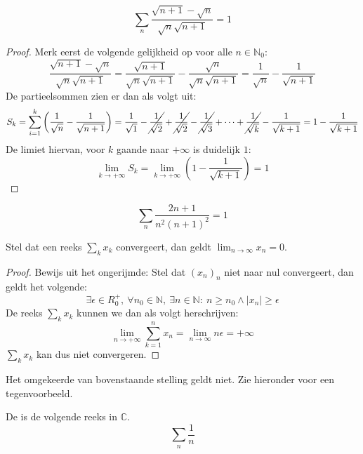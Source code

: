 \documentclass[main.tex]{subfiles}
\begin{document}
\begin{vb}
  \[ \sum_{n}\frac{\sqrt{n+1}-\sqrt{n}}{\sqrt{n}\sqrt{n+1}} = 1 \]

  \begin{proof}
    Merk eerst de volgende gelijkheid op voor alle $n\in\mathbb{N}_{0}$:
    \[ \frac{\sqrt{n+1}-\sqrt{n}}{\sqrt{n}\sqrt{n+1}} = \frac{\sqrt{n+1}}{\sqrt{n}\sqrt{n+1}} - \frac{\sqrt{n}}{\sqrt{n}\sqrt{n+1}} = \frac{1}{\sqrt{n}} - \frac{1}{\sqrt{n+1}} \]
    De partieelsommen zien er dan als volgt uit:
    \[
    S_{k}
    = \sum_{i=1}^{k}\left(\frac{1}{\sqrt{n}} - \frac{1}{\sqrt{n+1}}\right)
    = \frac{1}{\sqrt{1}} - \cancel{\frac{1}{\sqrt{2}}} + \cancel{\frac{1}{\sqrt{2}}} - \cancel{\frac{1}{\sqrt{3}}} + \dotsb + \cancel{\frac{1}{\sqrt{k}}} - \frac{1}{\sqrt{k+1}}
    = 1 - \frac{1}{\sqrt{k+1}}
    \]
    De limiet hiervan, voor $k$ gaande naar $+\infty$ is duidelijk $1$:
    \[ \lim_{k\rightarrow +\infty}S_{k} = \lim_{k \rightarrow +\infty}\left(1-\frac{1}{\sqrt{k+1}}\right) = 1 \]
  \end{proof}
\end{vb}

\begin{vb}
  \[ \sum_{n}\frac{2n+1}{n^{2}(n+1)^{2}} = 1 \]
\end{vb}

\begin{bpr}
  \label{pr:termen-van-convergente-reeks-naar-0}
  Stel dat een reeks $\sum_{k}x_{k}$ convergeert, dan geldt $\lim_{n \rightarrow \infty}x_{n} = 0$.

  \begin{proof}
    Bewijs uit het ongerijmde:
    Stel dat $(x_{n})_{n}$ niet naar nul convergeert, dan geldt het volgende:
    \[ \exists \epsilon \in R_{0}^{+},\ \forall n_{0}\in \mathbb{N},\ \exists n\in \mathbb{N}:\ n \ge n_{0} \wedge |x_{n}| \ge \epsilon \]
    De reeks $\sum_{k}x_{k}$ kunnen we dan als volgt herschrijven:
    \[ \lim_{n\rightarrow +\infty}\sum_{k=1}^{n}x_{n} = \lim_{n \rightarrow \infty}n\epsilon = +\infty \]
    $\sum_{k}x_{k}$ kan dus niet convergeren.
    \feed
  \end{proof}
\end{bpr}

\begin{tvb}
  Het omgekeerde van bovenstaande stelling geldt niet.
  Zie hieronder voor een tegenvoorbeeld.
\end{tvb}

\begin{de}
  De  is de volgende reeks in $\mathbb{C}$.
  \[ \sum_{n}\frac{1}{n} \]
\end{de}
\end{document}
